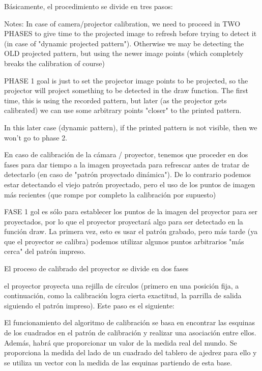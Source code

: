 Básicamente, el procedimiento se divide en tres pasos: 

 Notes: In case of camera/projector calibration, we need to proceed in TWO PHASES to give time to the projected image to refresh before trying to detect it (in case of "dynamic projected pattern"). Otherwise we may be detecting the OLD projected pattern, but using the newer image points (which completely breaks the calibration of course)
                
PHASE 1 goal is just to set the projector image points to be projected, so the projector  will project something to be detected in the draw function. The first time, this is using the recorded pattern, but later (as the projector gets calibrated) we can use some arbitrary points "closer" to the printed pattern.

In this later case (dynamic pattern), if the printed pattern is not visible, then we won't go to phase 2. 
                

En caso de calibración de la cámara / proyector, tenemos que proceder en dos fases para dar tiempo a la imagen proyectada para refrescar antes de tratar de detectarlo (en caso de "patrón proyectado dinámica"). De lo contrario podemos estar detectando el viejo patrón proyectado, pero el uso de los puntos de imagen más recientes (que rompe por completo la calibración por supuesto) 

FASE 1 gol es sólo para establecer los puntos de la imagen del proyector para ser proyectados, por lo que el proyector proyectará algo para ser detectado en la función draw. La primera vez, esto es usar el patrón grabado, pero más tarde (ya que el proyector se calibra) podemos utilizar algunos puntos arbitrarios "más cerca" del patrón impreso.



El proceso de calibrado del proyector se divide en dos fases

el proyector proyecta una rejilla de círculos (primero en una posición fija, a continuación, como la calibración logra cierta exactitud, la parrilla de salida siguiendo el patrón impreso). Este paso es el siguiente: 

El funcionamiento del algoritmo de calibración se basa en encontrar las esquinas de los cuadrados en el patrón de calibración y realizar una asociación entre ellos. Además, habrá que proporcionar un valor de la medida real del mundo. Se proporciona la medida del lado de un cuadrado del tablero de ajedrez para ello y se utiliza un vector con la medida de las esquinas partiendo de esta base.

